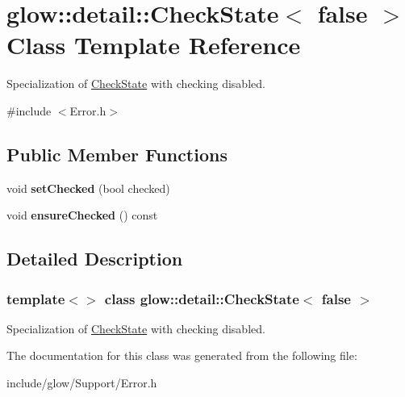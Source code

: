 \hypertarget{classglow_1_1detail_1_1_check_state_3_01false_01_4}{}\section{glow\+:\+:detail\+:\+:Check\+State$<$ false $>$ Class Template Reference}
\label{classglow_1_1detail_1_1_check_state_3_01false_01_4}


Specialization of \hyperlink{classglow_1_1detail_1_1_check_state}{Check\+State} with checking disabled.  




{\ttfamily \#include $<$Error.\+h$>$}

\subsection*{Public Member Functions}
\begin{DoxyCompactItemize}
\item 
\mbox{\label{classglow_1_1detail_1_1_check_state_3_01false_01_4_affd35bd7c89726095003be71bde0d011}} 
void {\bfseries set\+Checked} (bool checked)
\item 
\mbox{\label{classglow_1_1detail_1_1_check_state_3_01false_01_4_a92e781ed346dfe4ae7e59a3b444e3dae}} 
void {\bfseries ensure\+Checked} () const
\end{DoxyCompactItemize}


\subsection{Detailed Description}
\subsubsection*{template$<$$>$\newline
class glow\+::detail\+::\+Check\+State$<$ false $>$}

Specialization of \hyperlink{classglow_1_1detail_1_1_check_state}{Check\+State} with checking disabled. 

The documentation for this class was generated from the following file\+:\begin{DoxyCompactItemize}
\item 
include/glow/\+Support/Error.\+h\end{DoxyCompactItemize}
